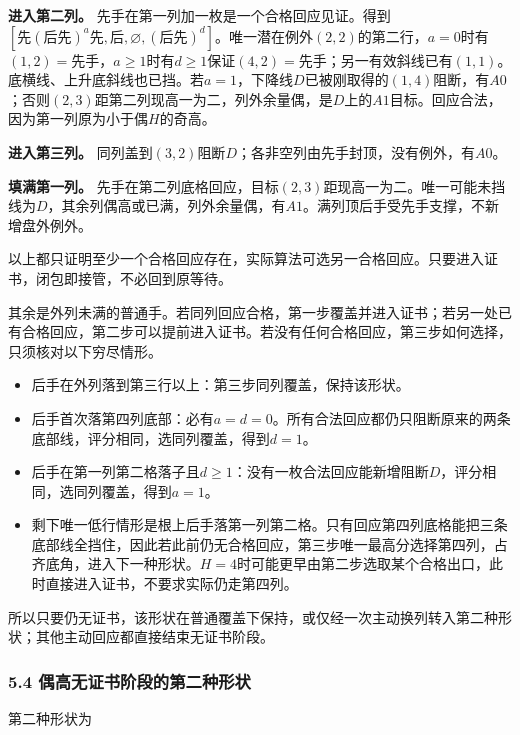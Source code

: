 \documentclass[
  a4paper,
]{article}
\providecommand{\tightlist}{%
  \setlength{\itemsep}{0pt}\setlength{\parskip}{0pt}}
\begin{document}
\textbf{进入第二列。}
先手在第一列加一枚是一个合格回应见证。得到\([\text{先}(\text{后先})^a\text{先},\text{后},\varnothing ,(\text{后先})^d]\)。唯一潜在例外\((2,2)\)的第二行，\(a=0\)时有\((1,2)=\text{先手}\)，\(a\ge 1\)时有\(d\ge 1\)保证\((4,2)=\text{先手}\)；另一有效斜线已有\((1,1)\)。底横线、上升底斜线也已挡。若\(a=1\)，下降线\(D\)已被刚取得的\((1,4)\)阻断，有\(A0\)；否则\((2,3)\)距第二列现高一为二，列外余量偶，是\(D\)上的\(A1\)目标。回应合法，因为第一列原为小于偶\(H\)的奇高。

\textbf{进入第三列。}
同列盖到\((3,2)\)阻断\(D\)；各非空列由先手封顶，没有例外，有\(A0\)。

\textbf{填满第一列。}
先手在第二列底格回应，目标\((2,3)\)距现高一为二。唯一可能未挡线为\(D\)，其余列偶高或已满，列外余量偶，有\(A1\)。满列顶后手受先手支撑，不新增盘外例外。

以上都只证明至少一个合格回应存在，实际算法可选另一合格回应。只要进入证书，闭包即接管，不必回到原等待。

其余是外列未满的普通手。若同列回应合格，第一步覆盖并进入证书；若另一处已有合格回应，第二步可以提前进入证书。若没有任何合格回应，第三步如何选择，只须核对以下穷尽情形。

\begin{itemize}
\tightlist
\item
  后手在外列落到第三行以上：第三步同列覆盖，保持该形状。
\item
  后手首次落第四列底部：必有\(a=d=0\)。所有合法回应都仍只阻断原来的两条底部线，评分相同，选同列覆盖，得到\(d=1\)。
\item
  后手在第一列第二格落子且\(d\ge 1\)：没有一枚合法回应能新增阻断\(D\)，评分相同，选同列覆盖，得到\(a=1\)。
\item
  剩下唯一低行情形是根上后手落第一列第二格。只有回应第四列底格能把三条底部线全挡住，因此若此前仍无合格回应，第三步唯一最高分选择第四列，占齐底角，进入下一种形状。\(H=4\)时可能更早由第二步选取某个合格出口，此时直接进入证书，不要求实际仍走第四列。
\end{itemize}

所以只要仍无证书，该形状在普通覆盖下保持，或仅经一次主动换列转入第二种形状；其他主动回应都直接结束无证书阶段。

\subsubsection{5.4
偶高无证书阶段的第二种形状}\label{ux5076ux9ad8ux65e0ux8bc1ux4e66ux9636ux6bb5ux7684ux7b2cux4e8cux79cdux5f62ux72b6}

第二种形状为
\end{document}
